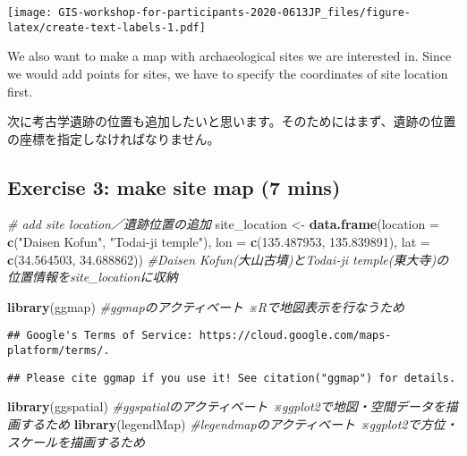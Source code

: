 \documentclass[
  xelatex,ja=standard]{bxjsarticle}
\newenvironment{Shaded}{\begin{snugshade}}{\end{snugshade}}
\newcommand{\CommentTok}[1]{\textcolor[rgb]{0.56,0.35,0.01}{\textit{#1}}}
\newcommand{\DataTypeTok}[1]{\textcolor[rgb]{0.13,0.29,0.53}{#1}}
\newcommand{\FloatTok}[1]{\textcolor[rgb]{0.00,0.00,0.81}{#1}}
\newcommand{\KeywordTok}[1]{\textcolor[rgb]{0.13,0.29,0.53}{\textbf{#1}}}
\newcommand{\NormalTok}[1]{#1}
\newcommand{\StringTok}[1]{\textcolor[rgb]{0.31,0.60,0.02}{#1}}
\begin{document}
\texttt{[image: GIS-workshop-for-participants-2020-0613JP\_files/figure-latex/create-text-labels-1.pdf]}

We also want to make a map with archaeological sites we are interested
in. Since we would add points for sites, we have to specify the
coordinates of site location first.

次に考古学遺跡の位置も追加したいと思います。そのためにはまず、遺跡の位置の座標を指定しなければなりません。

\hypertarget{exercise-3-make-site-map-7-mins}{%
\subsection{Exercise 3: make site map (7
mins)}\label{exercise-3-make-site-map-7-mins}}

\begin{Shaded}
\begin{Highlighting}[]
\CommentTok{# add site location／遺跡位置の追加  }
\NormalTok{site_location <-}
\StringTok{  }\KeywordTok{data.frame}\NormalTok{(}\DataTypeTok{location =} \KeywordTok{c}\NormalTok{(}\StringTok{"Daisen Kofun"}\NormalTok{, }\StringTok{"Todai-ji temple"}\NormalTok{),}
             \DataTypeTok{lon =} \KeywordTok{c}\NormalTok{(}\FloatTok{135.487953}\NormalTok{, }\FloatTok{135.839891}\NormalTok{),}
             \DataTypeTok{lat =} \KeywordTok{c}\NormalTok{(}\FloatTok{34.564503}\NormalTok{, }\FloatTok{34.688862}\NormalTok{))  }\CommentTok{#Daisen Kofun(大山古墳)とTodai-ji temple(東大寺)の位置情報をsite_locationに収納}

\KeywordTok{library}\NormalTok{(ggmap) }\CommentTok{#ggmapのアクティベート ※Rで地図表示を行なうため}
\end{Highlighting}
\end{Shaded}

\begin{verbatim}
## Google's Terms of Service: https://cloud.google.com/maps-platform/terms/.
\end{verbatim}

\begin{verbatim}
## Please cite ggmap if you use it! See citation("ggmap") for details.
\end{verbatim}

\begin{Shaded}
\begin{Highlighting}[]
\KeywordTok{library}\NormalTok{(ggspatial) }\CommentTok{#ggspatialのアクティベート ※ggplot2で地図・空間データを描画するため}
\KeywordTok{library}\NormalTok{(legendMap) }\CommentTok{#legendmapのアクティベート ※ggplot2で方位・スケールを描画するため}
\end{Highlighting}
\end{Shaded}
\end{document}
